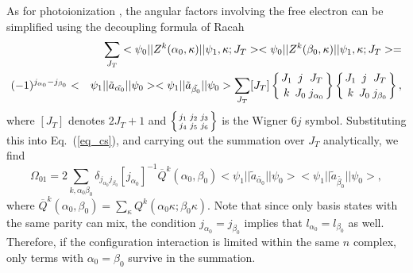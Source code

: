 \documentclass[preprint, floatfix, pra, showpacs, showkeys]{revtex4}
\newcommand{\sixj}[6]{\ensuremath{\left\{{#1\atop #4}{#2\atop #5}
{#3\atop #6}\right\}}}
\begin{document}
As for photoionization \cite{gu02b}, the angular factors involving the free
electron can be simplified using the decoupling formula of Racah
\begin{eqnarray}
&&\sum_{J_T}<\psi_0||Z^k(\alpha_0, \kappa)||\psi_1,\kappa;J_T>
<\psi_0||Z^k(\beta_0, \kappa)||\psi_1,\kappa;J_T> = \nonumber\\*
&(-1)^{j_{\alpha_0}-j_{\beta_0}}<&\psi_1||\tilde{a}_{\tilde{\alpha_0}}||\psi_0>
<\psi_1||\tilde{a}_{\tilde{\beta_0}}||\psi_0>
\sum_{J_T}[J_T]\sixj{J_1}{j}{J_T}{k}{J_0}{j_{\alpha_0}}
\sixj{J_1}{j}{J_T}{k}{J_0}{j_{\beta_0}},
\end{eqnarray}
where $[J_T]$ denotes $2J_T+1$ and $\sixj{j_1}{j_2}{j_3}{j_4}{j_5}{j_6}$ is
the Wigner $6j$ symbol. 
Substituting this into Eq.~(\ref{eq_cs}), and carrying
out the summation over $J_T$ analytically, we find
\begin{equation}
\label{eq_scs}
\Omega_{01} = 2\sum_{k,\alpha_0\beta_0}
\delta_{j_{\alpha_0}j_{\beta_0}}[j_{\alpha_0}]^{-1} 
\overline{Q}^k(\alpha_0,\beta_0)
<\psi_1||\tilde{a}_{\tilde{\alpha_0}}||\psi_0>
<\psi_1||\tilde{a}_{\tilde{\beta_0}}||\psi_0>,
\end{equation}
where $\overline{Q}^k(\alpha_0,\beta_0) = \sum_\kappa
Q^k(\alpha_0\kappa;\beta_0\kappa)$.
Note that since only basis states with the same parity can mix, the condition
$j_{\alpha_0}=j_{\beta_0}$ implies that $l_{\alpha_0} = l_{\beta_0}$ as
well. Therefore, if the configuration interaction is limited within the same
$n$ complex, only terms with $\alpha_0 = \beta_0$ survive in the summation. 
\end{document}
